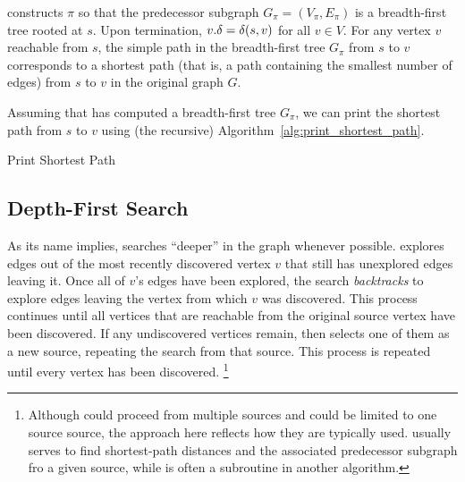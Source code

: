  constructs \(\pi\) so that the predecessor subgraph \(G_\pi = (V_\pi,E_\pi)\) is a breadth-first tree rooted at \(s\).
Upon termination, \(v\mathtt{.}\delta = \delta(s,v)\) for all \(v\in V\).
For any vertex \(v\) reachable from \(s\), the simple path in the breadth-first tree \(G_\pi\) from \(s\) to \(v\) corresponds to a shortest path (that is, a path containing the smallest number of edges) from \(s\) to \(v\) in the original graph \(G\).

Assuming that  has computed a breadth-first tree \(G_\pi\), we can print the shortest path from \(s\) to \(v\) using (the recursive) Algorithm~\ref{alg:print_shortest_path}.
\begin{algorithm}[h]
\caption{Print Shortest Path}\label{alg:print_shortest_path}
\begin{algorithmic}[1]
    \State {}
    \State {}
  \Else
    \State {}
    \State {}
  \EndIf
\EndFunction
\end{algorithmic}
\end{algorithm}


\subsection{Depth-First Search}
\label{sec:dfs}

As its name implies,  searches ``deeper'' in the graph whenever possible.
 explores edges out of the most recently discovered vertex \(v\) that still has unexplored edges leaving it.
Once all of \(v\)'s edges have been explored, the search \emph{backtracks} to explore edges leaving the vertex from which \(v\) was discovered.
This process continues until all vertices that are reachable from the original source vertex have been discovered.
If any undiscovered vertices remain, then  selects one of them as a new source, repeating the search from that source.
This process is repeated until every vertex has been discovered.%
\footnote{Although  could proceed from multiple sources and  could be limited to one source source, the approach here reflects how they are typically used. 
 usually serves to find shortest-path distances and the associated predecessor subgraph fro a given source, while  is often a subroutine in another algorithm.}

